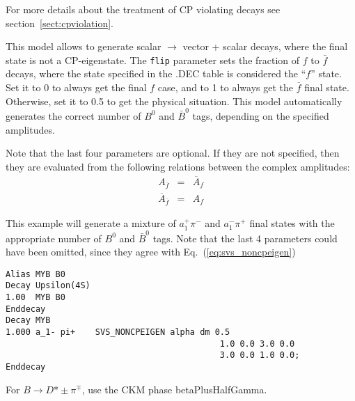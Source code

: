 \Notes
For more details about the treatment of CP violating decays 
see section~\ref{sect:cpviolation}.



\label{svsnoncpeigen}



\Expl
This model allows to generate scalar $\rightarrow$ vector + scalar
decays, where the final state is not a CP-eigenstate.  The {\tt flip}
parameter sets the fraction of $f$ to $\bar f$ decays, where the state
specified in the .DEC table is considered the ``$f$'' state.  Set it
to 0 to always get the final $f$ case, and to 1 to always get the
$\overline{f}$ final state. Otherwise, set it to 0.5 to get the
physical situation. This model automatically generates the correct
number of $B^{0}$ and $\bar{B}^{0}$ tags, depending on the specified
amplitudes.

Note that the last four parameters are optional. If they are not
specified, then they are evaluated from the following relations
between the complex amplitudes:
\begin{eqnarray}
          A_{\overline f} &=& \overline A_f \nonumber\\
\overline A_{\overline f} &=&           A_f  
\label{eq:svs_noncpeigen}
\end{eqnarray}

\Example
This example will generate a mixture of $a_1^+ \pi^-$ and $a_1^- \pi^+$
final states with the appropriate number of $B^0$ and $\bar B^0$ tags.
Note that the last 4 parameters could have been omitted, since they 
agree with Eq.~(\ref{eq:svs_noncpeigen})

\begin{verbatim}
Alias MYB B0
Decay Upsilon(4S)
1.00  MYB B0
Enddecay
Decay MYB
1.000 a_1- pi+    SVS_NONCPEIGEN alpha dm 0.5 
                                           1.0 0.0 3.0 0.0 
                                           3.0 0.0 1.0 0.0;
Enddecay
\end{verbatim}
For $B \rightarrow D{*\pm}\pi^\mp$, use the CKM phase betaPlusHalfGamma.

